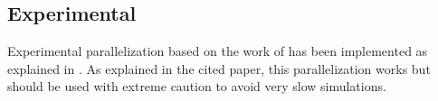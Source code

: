 \subsection{Experimental}

Experimental parallelization based on the work of \cite{MARTINEZ-JCP08} has been implemented as explained in \cite{MARTIN-BRAGADO-NIMB15}. As explained in the cited paper, this parallelization works but should be used with extreme caution to avoid very slow simulations.
